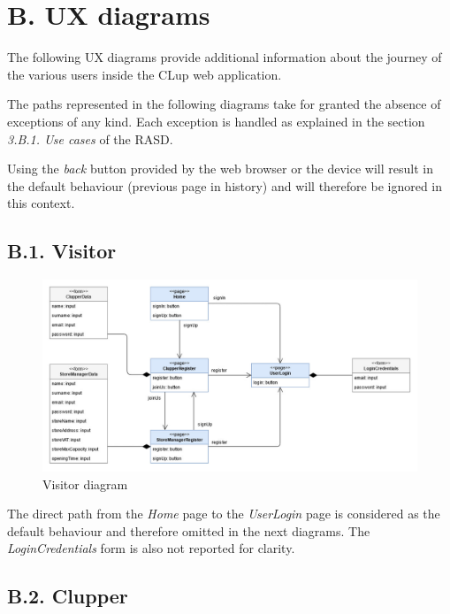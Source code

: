 \section{B. UX diagrams}

The following UX diagrams provide additional information about the journey of the various users inside the CLup web application.

The paths represented in the following diagrams take for granted the absence of exceptions of any kind. Each exception is handled as explained in the section \emph{3.B.1. Use cases} of the RASD.

Using the \emph{back} button provided by the web browser or the device will result in the default behaviour (previous page in history) and will therefore be ignored in this context.

\subsection{B.1. Visitor}

\begin{figure}[H]
\centering
\includegraphics{assets/dd/ux_diagrams/ux_visitor}
\caption{Visitor diagram}
\end{figure}

The direct path from the \emph{Home} page to the \emph{UserLogin} page is considered as the default behaviour and therefore omitted in the next diagrams. The \emph{LoginCredentials} form is also not reported for clarity.

\subsection{B.2. Clupper}

